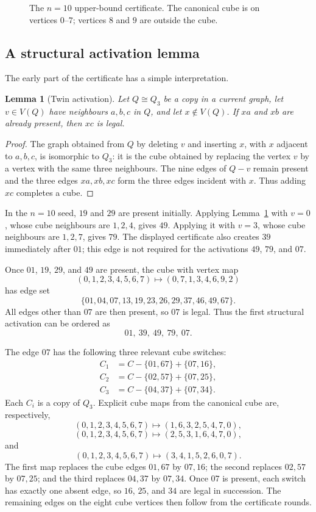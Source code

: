 \documentclass[11pt]{article}
\numberwithin{equation}{section}
\newtheorem{lemma}[theorem]{Lemma}
\begin{document}
\begin{figure}[t]
\centering
\resizebox{0.72\linewidth}{!}{}
\caption{The $n=10$ upper-bound certificate. The canonical cube is on vertices $0$--$7$; vertices $8$ and $9$ are outside the cube.}
\label{fig:n10seed}
\end{figure}

\subsection{A structural activation lemma}
The early part of the certificate has a simple interpretation.

\begin{lemma}[Twin activation]\label{lem:twin}
Let $Q\cong Q_3$ be a copy in a current graph, let $v\in V(Q)$ have neighbours $a,b,c$ in $Q$, and let $x\notin V(Q)$. If $xa$ and $xb$ are already present, then $xc$ is legal.
\end{lemma}

\begin{proof}
The graph obtained from $Q$ by deleting $v$ and inserting $x$, with $x$ adjacent to $a,b,c$, is isomorphic to $Q_3$: it is the cube obtained by replacing the vertex $v$ by a vertex with the same three neighbours. The nine edges of $Q-v$ remain present and the three edges $xa,xb,xc$ form the three edges incident with $x$. Thus adding $xc$ completes a cube.
\end{proof}

In the $n=10$ seed, $19$ and $29$ are present initially. Applying Lemma~\ref{lem:twin} with $v=0$, whose cube neighbours are $1,2,4$, gives $49$. Applying it with $v=3$, whose cube neighbours are $1,2,7$, gives $79$. The displayed certificate also creates $39$ immediately after $01$; this edge is not required for the activations $49$, $79$, and $07$.

Once $01$, $19$, $29$, and $49$ are present, the cube with vertex map
\[
(0,1,2,3,4,5,6,7)\longmapsto(0,7,1,3,4,6,9,2)
\]
has edge set
\[
\{01,04,07,13,19,23,26,29,37,46,49,67\}.
\]
All edges other than $07$ are then present, so $07$ is legal. Thus the first structural activation can be ordered as
\[
01,\ 39,\ 49,\ 79,\ 07.
\]

The edge $07$ has the following three relevant cube switches:
\[
\begin{aligned}
C_1&=C-\{01,67\}+\{07,16\},\\
C_2&=C-\{02,57\}+\{07,25\},\\
C_3&=C-\{04,37\}+\{07,34\}.
\end{aligned}
\tag{5.3}
\]
Each $C_i$ is a copy of $Q_3$. Explicit cube maps from the canonical cube are, respectively,
\[
(0,1,2,3,4,5,6,7)\mapsto(1,6,3,2,5,4,7,0),
\]
\[
(0,1,2,3,4,5,6,7)\mapsto(2,5,3,1,6,4,7,0),
\]
and
\[
(0,1,2,3,4,5,6,7)\mapsto(3,4,1,5,2,6,0,7).
\]
The first map replaces the cube edges $01,67$ by $07,16$; the second replaces $02,57$ by $07,25$; and the third replaces $04,37$ by $07,34$. Once $07$ is present, each switch has exactly one absent edge, so $16$, $25$, and $34$ are legal in succession. The remaining edges on the eight cube vertices then follow from the certificate rounds.
\end{document}
